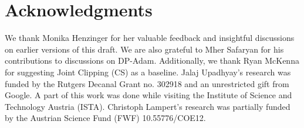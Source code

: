 \section*{Acknowledgments}
We thank Monika Henzinger for her valuable feedback and insightful discussions on earlier versions of this draft. We are also grateful to Mher Safaryan for his contributions to discussions on DP-Adam. Additionally, we thank Ryan McKenna for suggesting Joint Clipping (CS) as a baseline. 
Jalaj Upadhyay's research was funded by the Rutgers Decanal Grant no. 302918 and an unrestricted gift from Google. A part of this work was done while visiting the Institute of Science and Technology Austria (ISTA). Christoph Lampert's research was partially funded by the Austrian Science Fund (FWF) 10.55776/COE12.

